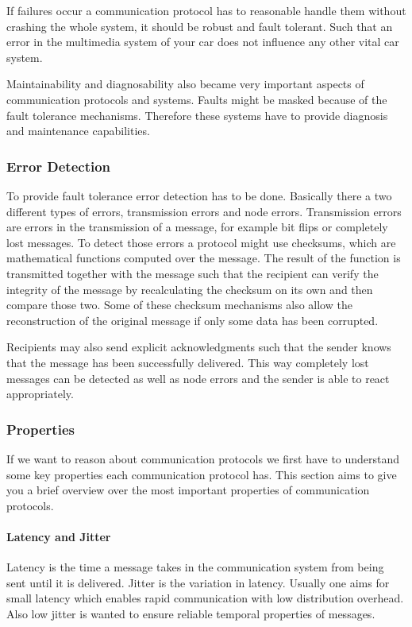 \documentclass[pdftex,12pt,a4paper,fleqn]{scrartcl}
\begin{document}
If failures occur a communication protocol has to reasonable handle them without crashing the whole system, it should be robust and fault tolerant. Such that an error in the multimedia system of your car does not influence  any other vital car system.

Maintainability and diagnosability also became very important aspects of communication protocols and systems. Faults might be masked because of the fault tolerance mechanisms. Therefore these systems have to provide diagnosis and maintenance capabilities.

\subsubsection{Error Detection}
To provide fault tolerance error detection has to be done. Basically there a two different types of errors, transmission errors and node errors. Transmission errors are errors in the transmission of a message, for example bit flips or completely lost messages. To detect those errors a protocol might use checksums, which are mathematical functions computed over the message. The result of the function is transmitted together with the message such that the recipient can verify the integrity of the message by recalculating the checksum on its own and then compare those two. Some of these checksum mechanisms also allow the reconstruction of the original message if only some data has been corrupted.

Recipients may also send explicit acknowledgments such that the sender knows that the message has been successfully delivered. This way completely lost messages can be detected as well as node errors and the sender is able to react appropriately.

\subsubsection{Properties}
If we want to reason about communication protocols we first have to understand some key properties each communication protocol has. This section aims to give you a brief overview over the most important properties of communication protocols.

\paragraph{Latency and Jitter} Latency is the time a message takes in the communication system from being sent until it is delivered. Jitter is the variation in latency. Usually one aims for small latency which enables rapid communication with low distribution overhead. Also low jitter is wanted to ensure reliable temporal properties of messages.
\end{document}
